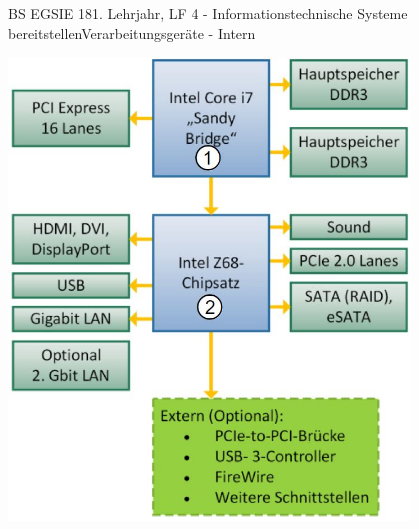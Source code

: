 \documentclass[oneside,openany,headings=optiontotoc,11pt,numbers=noenddot]{article}
\begin{document}
\begin{worksheet}{BS EGSIE 18}{1. Lehrjahr, LF 4 - Informationstechnische Systeme bereitstellen}{Verarbeitungsgeräte - Intern}
\begin{minipage}[c]{0.48\textwidth}
			\includegraphics[width=0.8\textwidth]{../99_Bilder/Chi7.jpg}
		\end{minipage}

\end{worksheet}
\end{document}
